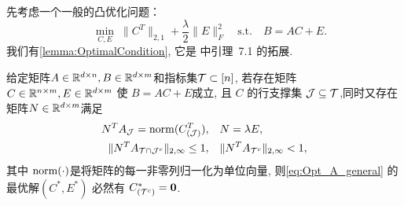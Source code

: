 先考虑一个一般的凸优化问题：
\begin{equation}\label{eq:Opt_A_general}
  \quad \min_{C, E} \; \|C^T\|_{2,1}+\frac{\lambda}{2}\|E\|^2_F \quad
  \text{s.t.} \quad B=AC+E.
\end{equation}
我们有\autoref{lemma:OptimalCondition},  它是
\cite{soltanolkotabi2012geometric}中引理~7.1 的拓展.
\begin{lemma}\label{lemma:OptimalCondition}
  给定矩阵\(A\in \mathbb{R}^{d\times n}, B \in \mathbb{R}^{d\times m}\)和指标集\(\mathcal{T}\subset [n]\),
  若存在矩阵 \(C\in \mathbb{R}^{n\times m},E\in \mathbb{R}^{d\times m}\) 使 \(B=AC+E\)成立, 且
  \(C\) 的行支撑集 \(\mathcal{J}\subseteq
  \mathcal{T}\),同时又存在矩阵\(N\in\mathbb{R}^{d\times m}\)满足
  \begin{align*}
    N^T A_{\mathcal{J}} = \operatorname{norm}(C_{(\mathcal{J})}^T),  & \quad N=\lambda E, \\
    \|N^T A_{\mathcal{T}\cap \mathcal{J}^{c}}\|_{2, \infty} \leq 1, & \quad \|N^T A_{\mathcal{T}^{c}}\|_{2, \infty}<1,
  \end{align*}
  其中 \(\operatorname{norm}(\cdot)\)是将矩阵的每一非零列归一化为单位向量,
  则\eqref{eq:Opt_A_general} 的最优解\((C^{*},E^{*})\) 必然有
  \(C^*_{(\mathcal{T}^c)}=\mathbf{0}\).
\end{lemma}
